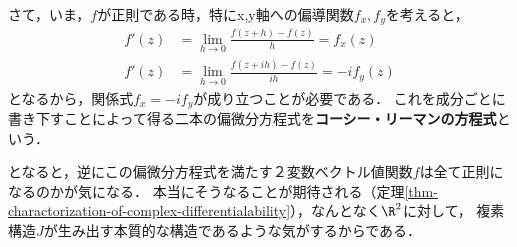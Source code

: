 \documentclass[uplatex, dvipdfmx]{jsreport}
\begin{document}
\begin{discussion}[複素微分可能であるために追加で必要な条件]
    さて，いま，$f$が正則である時，特にx,y軸への偏導関数$f_x,f_y$を考えると，
    \begin{align*}
        f'(z) &= \lim_{h\to 0}\frac{f(z+h)-f(z)}{h} =f_x(z) \\
        f'(z) &= \lim_{h\to 0}\frac{f(z+ih)-f(z)}{ih} =-if_y(z)
    \end{align*}
    となるから，関係式$f_x=-if_y$が成り立つことが必要である．
    これを成分ごとに書き下すことによって得る二本の偏微分方程式を\textbf{コーシー・リーマンの方程式}という．

    となると，逆にこの偏微分方程式を満たす２変数ベクトル値関数$f$は全て正則になるのかが気になる．
    本当にそうなることが期待される（定理\ref{thm-charactorization-of-complex-differentialability}），なんとなく$\R^2$に対して，
    複素構造$J$が生み出す本質的な構造であるような気がするからである．
\end{discussion}
\end{document}
